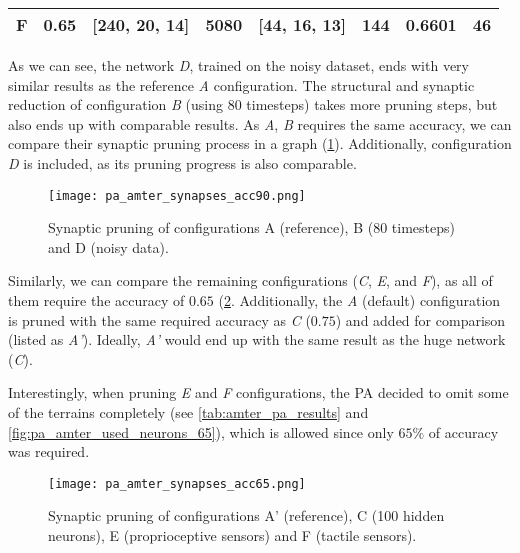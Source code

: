 \begin{table}[H]
{\begin{tabular}{|c|c|c|c|c|c|c|c|}
\textbf{F} & 0.65                                                                 & {[}240, 20, 14{]}                                                   & 5080                                                               & {[}44, 16, 13{]}                                                   & 144                                                               & 0.6601                                                                     & 46                                                               \\ \hline
\end{tabular}}
\end{table}

As we can see, the network \textit{D}, trained on the noisy dataset, ends with very similar results as the reference \textit{A} configuration. The structural and synaptic reduction of configuration \textit{B} (using 80 timesteps) takes more pruning steps, but also ends up with comparable results. As \textit{A}, \textit{B} requires the same accuracy, we can compare their synaptic pruning process in a graph (\cref{fig:pa_amter_synapses_90}). Additionally, configuration \textit{D} is included, as its pruning progress is also comparable.

\begin{figure}[H]
  \centering
  \texttt{[image: pa\_amter\_synapses\_acc90.png]}
  \caption{Synaptic pruning of configurations A (reference), B (80 timesteps) and D (noisy data).}
  \label{fig:pa_amter_synapses_90}
\end{figure}

Similarly, we can compare the remaining configurations (\textit{C}, \textit{E}, and \textit{F}), as all of them require the accuracy of $ 0.65 $ (\cref{fig:pa_amter_synapses_65}. Additionally, the \textit{A} (default) configuration is pruned with the same required accuracy as \textit{C} ($ 0.75 $) and added for comparison (listed as \textit{A'}). Ideally, \textit{A'} would end up with the same result as the huge network (\textit{C}).

Interestingly, when pruning \textit{E} and \textit{F} configurations, the PA decided to omit some of the terrains completely (see \cref{tab:amter_pa_results} and \cref{fig:pa_amter_used_neurons_65}), which is allowed since only $ 65\% $ of accuracy was required. 

\begin{figure}[H]
  \centering
  \texttt{[image: pa\_amter\_synapses\_acc65.png]}
  \caption{Synaptic pruning of configurations A' (reference), C (100 hidden neurons), E (proprioceptive sensors) and F (tactile sensors).}
  \label{fig:pa_amter_synapses_65}
\end{figure}

